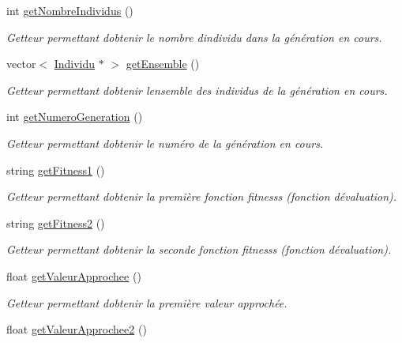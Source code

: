 \begin{DoxyCompactItemize}
int \hyperlink{class_population_ad6af7c30607b65d2b7f8d4750443bc0b}{get\+Nombre\+Individus} ()
\begin{DoxyCompactList}\small\item\em Getteur permettant d\textquotesingle{}obtenir le nombre d\textquotesingle{}individu dans la génération en cours. \end{DoxyCompactList}\item 
vector$<$ \hyperlink{class_individu}{Individu} $\ast$ $>$ \hyperlink{class_population_a2616c1ee49a009f91f36ff6a2798784b}{get\+Ensemble} ()
\begin{DoxyCompactList}\small\item\em Getteur permettant d\textquotesingle{}obtenir l\textquotesingle{}ensemble des individus de la génération en cours. \end{DoxyCompactList}\item 
int \hyperlink{class_population_ab43617fa07bb45f18b426f3677243799}{get\+Numero\+Generation} ()
\begin{DoxyCompactList}\small\item\em Getteur permettant d\textquotesingle{}obtenir le numéro de la génération en cours. \end{DoxyCompactList}\item 
string \hyperlink{class_population_ae0fc085745b5611153c46e02e08fb367}{get\+Fitness1} ()
\begin{DoxyCompactList}\small\item\em Getteur permettant d\textquotesingle{}obtenir la première fonction fitnesss (fonction d\textquotesingle{}évaluation). \end{DoxyCompactList}\item 
string \hyperlink{class_population_a790aa479d01d5164ab47e107f7002287}{get\+Fitness2} ()
\begin{DoxyCompactList}\small\item\em Getteur permettant d\textquotesingle{}obtenir la seconde fonction fitnesss (fonction d\textquotesingle{}évaluation). \end{DoxyCompactList}\item 
float \hyperlink{class_population_a835c9a996c627d5e7672f880ef390499}{get\+Valeur\+Approchee} ()
\begin{DoxyCompactList}\small\item\em Getteur permettant d\textquotesingle{}obtenir la première valeur approchée. \end{DoxyCompactList}\item 
float \hyperlink{class_population_a00d211e7d650c681f78dcde25751afa2}{get\+Valeur\+Approchee2} ()

\end{DoxyCompactItemize}
